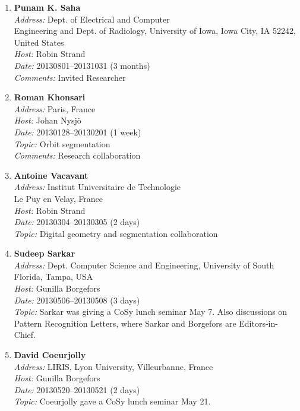 \begin{enumerate}
\item 
{\bf Punam K. Saha}~\\
{\em Address:} Dept. of Electrical and Computer ~\\ 
Engineering and Dept. of Radiology, University of Iowa, Iowa City, IA 52242, United States~\\
{\em Host:} Robin Strand~\\
{\em Date:} 20130801--20131031 (3 months)~\\
{\em Comments:} Invited Researcher

\item 
{\bf Roman Khonsari}~\\
{\em Address:} Paris, France~\\
{\em Host:} Johan Nysj\"{o}~\\
{\em Date:} 20130128--20130201 (1 week)~\\
{\em Topic:} Orbit segmentation~\\
{\em Comments:} Research collaboration



\item 
{\bf Antoine Vacavant}~\\
{\em Address:} Institut Universitaire de Technologie  ~\\ 
Le Puy en Velay, France~\\
{\em Host:} Robin Strand~\\
{\em Date:} 20130304--20130305 (2 days)~\\
{\em Topic:} Digital geometry and segmentation collaboration

\item 
{\bf Sudeep Sarkar}~\\
{\em Address:} Dept. Computer Science and Engineering, University of South Florida, Tampa, USA~\\
{\em Host:} Gunilla Borgefors~\\
{\em Date:} 20130506--20130508 (3 days)~\\
{\em Topic:} Sarkar was giving a CoSy lunch seminar May 7. Also discussions on Pattern Recognition Letters, where Sarkar and Borgefors are Editors-in-Chief.

\item 
{\bf David Coeurjolly}~\\
{\em Address:} LIRIS, Lyon University, Villeurbanne, France~\\
{\em Host:} Gunilla Borgefors~\\
{\em Date:} 20130520--20130521 (2 days)~\\
{\em Topic:} Coeurjolly gave a CoSy lunch seminar May 21.


\end{enumerate}
